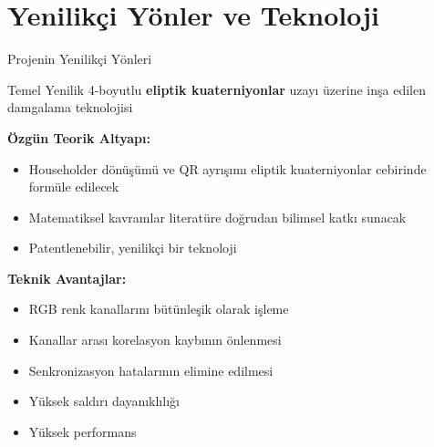 \documentclass[aspectratio=169,xcolor={dvipsnames}]{beamer}
\begin{document}

\section{Yenilikçi Yönler ve Teknoloji}

\begin{frame}{Projenin Yenilikçi Yönleri}
\begin{block}{Temel Yenilik}
4-boyutlu \textbf{eliptik kuaterniyonlar} uzayı üzerine inşa edilen damgalama teknolojisi
\end{block}

\textbf{Özgün Teorik Altyapı:}
\begin{itemize}
\item Householder dönüşümü ve QR ayrışımı eliptik kuaterniyonlar cebirinde formüle edilecek
\item Matematiksel kavramlar literatüre doğrudan bilimsel katkı sunacak
\item Patentlenebilir, yenilikçi bir teknoloji
\end{itemize}

\vspace{0.3cm}

\textbf{Teknik Avantajlar:}
\begin{itemize}
\item RGB renk kanallarını bütünleşik olarak işleme
\item Kanallar arası korelasyon kaybının önlenmesi
\item Senkronizasyon hatalarının elimine edilmesi
\item Yüksek saldırı dayanıklılığı
\item Yüksek performans
\end{itemize}
\end{frame}
\end{document}
